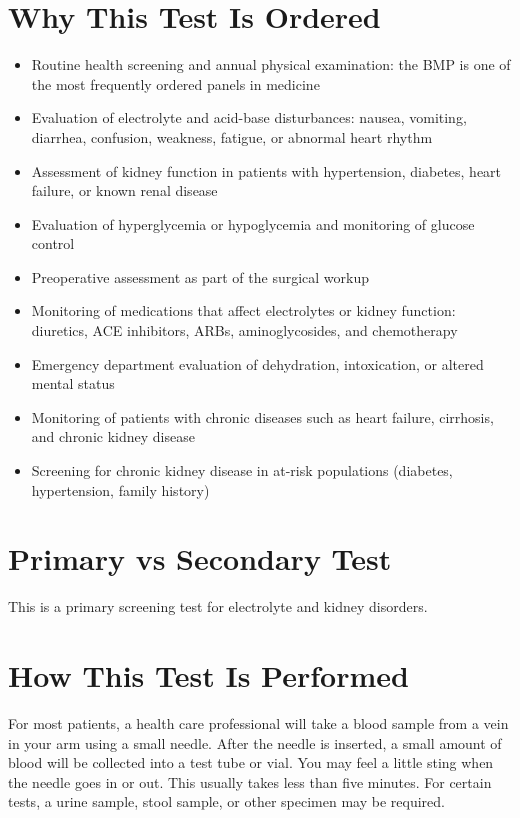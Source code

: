 \section*{Why This Test Is Ordered}
\begin{itemize}
  \item Routine health screening and annual physical examination: the BMP is one of the most frequently ordered panels in medicine
  \item Evaluation of electrolyte and acid-base disturbances: nausea, vomiting, diarrhea, confusion, weakness, fatigue, or abnormal heart rhythm
  \item Assessment of kidney function in patients with hypertension, diabetes, heart failure, or known renal disease
  \item Evaluation of hyperglycemia or hypoglycemia and monitoring of glucose control
  \item Preoperative assessment as part of the surgical workup
  \item Monitoring of medications that affect electrolytes or kidney function: diuretics, ACE inhibitors, ARBs, aminoglycosides, and chemotherapy
  \item Emergency department evaluation of dehydration, intoxication, or altered mental status
  \item Monitoring of patients with chronic diseases such as heart failure, cirrhosis, and chronic kidney disease
  \item Screening for chronic kidney disease in at-risk populations (diabetes, hypertension, family history)
\end{itemize}

\section*{Primary vs Secondary Test}
This is a primary screening test for electrolyte and kidney disorders.

\section*{How This Test Is Performed}
For most patients, a health care professional will take a blood sample from a vein in your arm using a small needle. After the needle is inserted, a small amount of blood will be collected into a test tube or vial. You may feel a little sting when the needle goes in or out. This usually takes less than five minutes. For certain tests, a urine sample, stool sample, or other specimen may be required.

